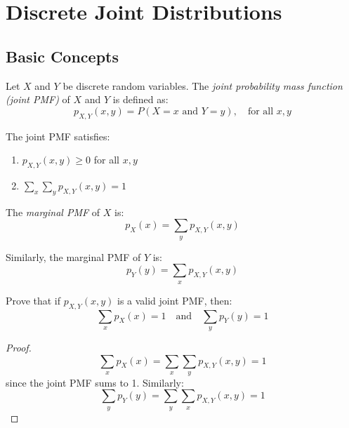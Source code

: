 \chapter{Discrete Joint Distributions}
\addtolength{\topmargin}{-0.9pt}

\section{Basic Concepts}

\begin{definition}
Let $X$ and $Y$ be discrete random variables. The \emph{joint probability mass function (joint PMF)} of $X$ and $Y$ is defined as:
\[
p_{X,Y}(x, y) = P(X = x \text{ and } Y = y), \quad \text{for all } x, y
\]

The joint PMF satisfies:
\begin{enumerate}
    \item $p_{X,Y}(x, y) \geq 0$ for all $x, y$
    \item $\sum_{x} \sum_{y} p_{X,Y}(x, y) = 1$
\end{enumerate}
\end{definition}

\begin{definition}
The \emph{marginal PMF} of $X$ is:
\[
p_X(x) = \sum_{y} p_{X,Y}(x, y)
\]

Similarly, the marginal PMF of $Y$ is:
\[
p_Y(y) = \sum_{x} p_{X,Y}(x, y)
\]
\end{definition}

\begin{exercise}
Prove that if $p_{X,Y}(x, y)$ is a valid joint PMF, then:
\[
\sum_{x} p_X(x) = 1 \quad \text{and} \quad \sum_{y} p_Y(y) = 1
\]
\end{exercise}

\begin{proof}
\[
\sum_{x} p_X(x) = \sum_{x} \sum_{y} p_{X,Y}(x, y) = 1
\]
since the joint PMF sums to 1. Similarly:
\[
\sum_{y} p_Y(y) = \sum_{y} \sum_{x} p_{X,Y}(x, y) = 1
\]
\end{proof}


